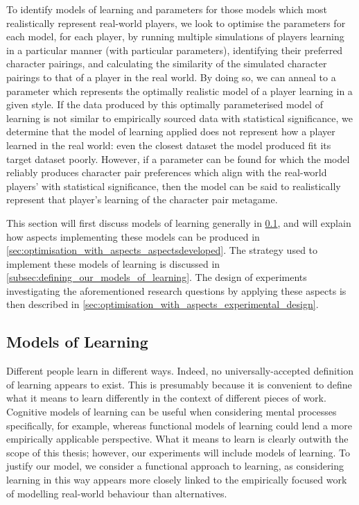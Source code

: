 To identify models of learning and parameters for those models which most
realistically represent real-world players, we look to optimise the parameters
for each model, for each player, by running multiple simulations of players
learning in a particular manner (with particular parameters), identifying their
preferred character pairings, and calculating the similarity of the simulated
character pairings to that of a player in the real world. By doing so, we can
anneal to a parameter which represents the optimally realistic model of a player
learning in a given style. If the data produced by this optimally parameterised
model of learning is not similar to empirically sourced data with statistical
significance, we determine that the model of learning applied does not represent
how a player learned in the real world: even the closest dataset the model
produced fit its target dataset poorly. However, if a parameter can be found for
which the model reliably produces character pair preferences which align with
the real-world players' with statistical significance, then the model can be
said to realistically represent that player's learning of the character pair
metagame.

This section will first discuss models of learning generally in
\cref{subsec:models_of_learning_discussed}, and will explain how aspects
implementing these models can be produced in
\cref{sec:optimisation_with_aspects_aspectsdeveloped}. The strategy used to
implement these models of learning is discussed in
\cref{subsec:defining_our_models_of_learning}. The design of experiments
investigating the aforementioned research questions by applying these aspects is
then described in \cref{sec:optimisation_with_aspects_experimental_design}.


\subsection{Models of Learning}\label{subsec:models_of_learning_discussed}
Different people learn in different ways. Indeed, no universally-accepted
definition of learning appears to exist. This is presumably because it is
convenient to define what it means to learn differently in the context of
different pieces of work. Cognitive models of learning can be useful when
considering mental processes specifically, for example, whereas functional
models of learning could lend a more empirically applicable perspective. What it
means to learn is clearly outwith the scope of this thesis; however, our
experiments will include models of learning. To justify our model, we consider a
functional approach to learning, as considering learning in this way appears
more closely linked to the empirically focused work of modelling real-world
behaviour than alternatives.

